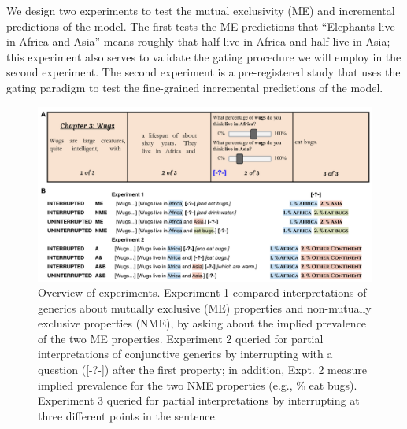 \documentclass[10pt,letterpaper]{article}
\newcommand{\red}[1]{{\textcolor{Red}{#1}}}
\begin{document}
We design two experiments to test the mutual exclusivity (ME) and incremental predictions of the model. 
The first tests the ME predictions that ``Elephants live in Africa and Asia'' means roughly that half live in Africa and half live in Asia; this experiment also serves to validate the gating procedure we will employ in the second experiment. 
The second experiment is a pre-registered study that uses the gating paradigm to test the fine-grained incremental predictions of the model.



\begin{figure}[h]
  \centering
    \includegraphics[width=1\textwidth]{design}
  \caption{Overview of experiments. Experiment 1 compared interpretations of generics about mutually exclusive (ME) properties and non-mutually exclusive properties (NME), by asking about the implied prevalence of the two ME properties. Experiment 2 queried for partial interpretations of conjunctive generics by interrupting with a question ([-?-]) after the first property;  in addition, Expt. 2 measure implied prevalence for the two NME properties (e.g., \% eat bugs). Experiment 3 queried for partial interpretations by interrupting at three different points in the sentence. }
  \label{fig:design}
\end{figure}
\end{document}
